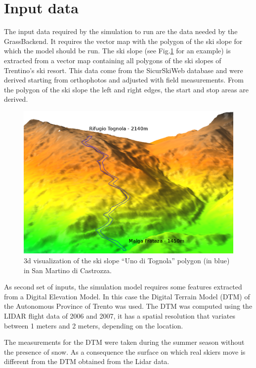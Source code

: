 \documentclass[12pt,a4paper,twoside]{book}
\begin{document}
\section{Input data}
The input data required by the simulation to run are the data needed by the GrassBackend. It requires the vector map with the polygon of the ski slope for which the model should be run. The ski slope (see Fig.\ref{uno_tognola_3d} for an example) is extracted from a vector map containing all polygons of the ski slopes of Trentino's ski resort. This data come from the SicurSkiWeb database and were derived starting from orthophotos and adjusted with field measurements. From the polygon of the ski slope the left and right edges, the start and stop areas are derived.

\begin{figure}[!h]
  \begin{center}
    \includegraphics[width=\textwidth]{images/uno_tognola_3d.eps}
    \caption{3d visualization of the ski slope ``Uno di Tognola'' polygon (in blue) in San Martino di Castrozza.}\label{uno_tognola_3d}
  \end{center}
\end{figure}

As second set of inputs, the simulation model requires some features extracted from a Digital Elevation Model. In this case the Digital Terrain Model (DTM) of the Autonomous Province of Trento was used. The DTM was computed using the LIDAR flight data of 2006 and 2007, it has a spatial resolution that variates between 1 meters and 2 meters, depending on the location.

The measurements for the DTM were taken during the summer season without the presence of snow. As a consequence the surface on which real skiers move is different from the DTM obtained from the Lidar data.
\end{document}

